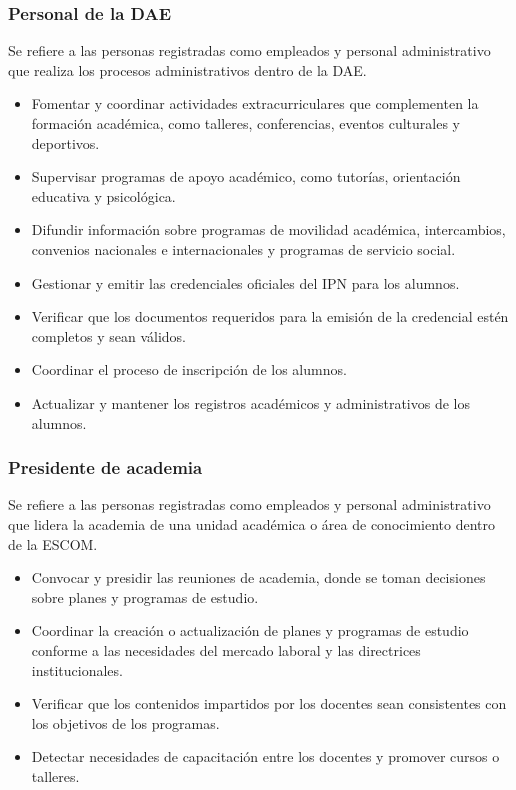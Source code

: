 \begin{Usuario}{\hypertarget{tPersonalDAE}{\subsubsection{Personal de la DAE}}}{
    Se refiere a las personas registradas como empleados y personal administrativo que realiza los procesos administrativos dentro de la DAE.
}

\item[Responsabilidades:] \cdtEmpty
\begin{itemize}
    \item Fomentar y coordinar actividades extracurriculares que complementen la formación académica, como talleres, conferencias, eventos culturales y deportivos.
    \item Supervisar programas de apoyo académico, como tutorías, orientación educativa y psicológica.
    \item Difundir información sobre programas de movilidad académica, intercambios, convenios nacionales e internacionales y programas de servicio social.
    \item Gestionar y emitir las credenciales oficiales del IPN para los alumnos.
    \item Verificar que los documentos requeridos para la emisión de la credencial estén completos y sean válidos.
    \item Coordinar el proceso de inscripción de los alumnos.
    \item Actualizar y mantener los registros académicos y administrativos de los alumnos. 

\end{itemize}
\end{Usuario}


\begin{Usuario}{\hypertarget{tPresidente}{\subsubsection{Presidente de academia}}}{
Se refiere a las personas registradas como empleados y personal administrativo que lidera la academia de una unidad académica o área de conocimiento dentro de la ESCOM.
}
\item[Responsabilidades:] \cdtEmpty
\begin{itemize}
    \item Convocar y presidir las reuniones de academia, donde se toman decisiones sobre planes y programas de estudio.
    \item Coordinar la creación o actualización de planes y programas de estudio conforme a las necesidades del mercado laboral y las directrices institucionales.
    \item Verificar que los contenidos impartidos por los docentes sean consistentes con los objetivos de los programas.
    \item Detectar necesidades de capacitación entre los docentes y promover cursos o talleres. 
\end{itemize}
\end{Usuario}

